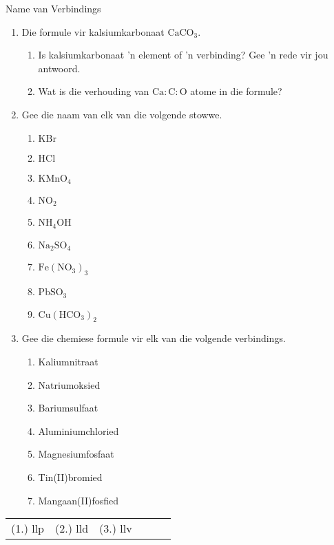   \label{m38708*secfhsst!!!underscore!!!id255}
            \begin{exercises}{Name van Verbindings}
{            \nopagebreak \noindent
      \label{m38708*id65118}\begin{enumerate}[noitemsep, label=\textbf{\arabic*}. ] 
            \label{m38708*uid47}\item Die formule vir kalsiumkarbonaat $\text{CaCO}{}_{3}$.
\label{m38708*id65148}\begin{enumerate}[noitemsep, label=\textbf{\alph*}. ] 
            \label{m38708*uid48}\item Is kalsiumkarbonaat 'n element of 'n verbinding? Gee 'n rede vir jou antwoord.
\label{m38708*uid49}\item Wat is die verhouding van $\text{Ca}:\text{C}:\text{O}$ atome in die formule?
\end{enumerate}
\label{m38708*uid50}\item Gee die naam van elk van die volgende stowwe.
\label{m38708*id65189}\begin{enumerate}[noitemsep, label=\textbf{\alph*}. ] 
            \label{m38708*uid51}\item $\text{KBr}$
\label{m38708*uid52}\item $\text{HCl}$
\label{m38708*uid53}\item ${\text{KMnO}}_{4}$\label{m38708*uid54}\item ${\text{NO}}_{2}$\label{m38708*uid55}\item ${\text{NH}}_{4}\text{OH}$
\label{m38708*uid56}\item ${\text{Na}}_{2}{\text{SO}}_{4}$
\item ${\text{Fe}}({\text{NO}}_{3})_3$
\item ${\text{Pb}}{\text{SO}}_{3}$
\item ${\text{Cu}}({\text{HCO}}_{3})_2$
\end{enumerate}
\label{m38708*uid57}\item Gee die chemiese formule vir elk van die volgende verbindings.
\label{m38708*id65338}\begin{enumerate}[noitemsep, label=\textbf{\alph*}. ] 
            \label{m38708*uid58}\item Kaliumnitraat
\label{m38708*uid59}\item Natriumoksied
\label{m38708*uid60}\item Bariumsulfaat
\label{m38708*uid61}\item Aluminiumchloried
\label{m38708*uid62}\item Magnesiumfosfaat
\item Tin(II)bromied
\item Mangaan(II)fosfied
\end{enumerate}
\end{enumerate}

\practiceinfo
\begin{tabular}[h]{cccccc}
 (1.) llp  &  (2.) lld  &  (3.) llv   & & 
\end{tabular}
}
\end{exercises}
